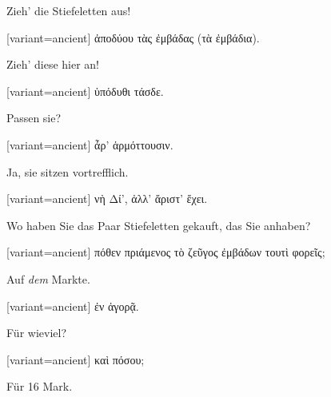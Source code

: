 Zieh' die Stiefeletten aus! 

\switchcolumn

\begin{greek}[variant=ancient]%
ἀποδύου τὰς ἐμβάδας (τὰ ἐμβάδια).

\end{greek}%
\switchcolumn*

Zieh' diese hier an! 

\switchcolumn

\begin{greek}[variant=ancient]%
ὑπόδυθι τάσδε.

\end{greek}%
\switchcolumn*

Passen sie? 

\switchcolumn

\begin{greek}[variant=ancient]%
ἆρ' ἁρμόττουσιν.

\end{greek}%
\switchcolumn*

Ja, sie sitzen vortrefflich. 

\switchcolumn

\begin{greek}[variant=ancient]%
νὴ Δί', ἀλλ' ἄριστ' ἔχει.

\end{greek}%
\switchcolumn*

Wo haben Sie das Paar Stiefeletten gekauft, das Sie anhaben? 

\switchcolumn

\begin{greek}[variant=ancient]%
πόθεν πριάμενος τὸ ζεῦγος ἐμβάδων τουτὶ φορεῖς;

\end{greek}%
\switchcolumn*

Auf \emph{dem} Markte. 

\switchcolumn

\begin{greek}[variant=ancient]%
ἐν ἀγορᾷ.

\end{greek}%
\switchcolumn*

Für wieviel? 

\switchcolumn

\begin{greek}[variant=ancient]%
καὶ πόσου;

\end{greek}%
\switchcolumn*

Für 16 Mark. 

